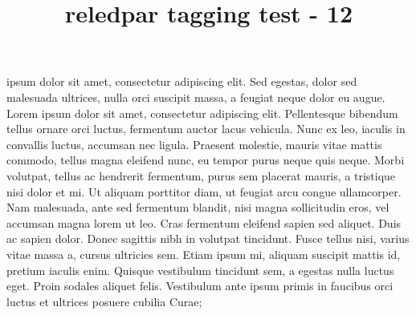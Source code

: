 \documentclass{article}
\title{reledpar tagging test - 12}
\begin{document}
\begin{pairs}\sloppy
\begin{Leftside}
    \beginnumbering
               \pstart
{} ipsum  dolor sit amet, consectetur adipiscing elit. Sed   egestas, dolor sed malesuada ultrices, nulla orci  suscipit massa, a feugiat neque dolor eu augue.  Lorem ipsum dolor sit amet, consectetur adipiscing  elit. Pellentesque bibendum  tellus ornare orci luctus, fermentum auctor lacus vehicula. Nunc ex leo, iaculis in  convallis  luctus, accumsan nec ligula. Praesent molestie, mauris vitae mattis commodo, tellus magna  eleifend nunc, eu tempor purus neque quis neque. Morbi volutpat, tellus ac hendrerit fermentum, purus sem placerat mauris, a tristique nisi dolor et mi. Ut aliquam porttitor diam, ut  feugiat arcu congue ullamcorper. Nam malesuada, ante sed fermentum blandit, nisi magna sollicitudin eros, vel accumsan magna lorem ut leo. Cras fermentum eleifend sapien sed aliquet. Duis ac sapien dolor. Donec sagittis nibh in volutpat tincidunt. Fusce tellus nisi, varius vitae massa a, cursus ultricies sem. Etiam ipsum mi, aliquam suscipit mattis id, pretium iaculis enim. Quisque vestibulum tincidunt sem, a egestas nulla  luctus eget. Proin sodales aliquet felis.  Vestibulum ante ipsum primis in faucibus orci luctus et  ultrices posuere cubilia Curae;

        \pend




\end{Leftside}
\end{pairs}
\end{document}

